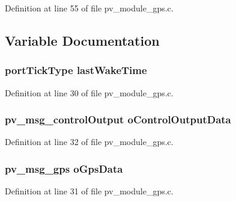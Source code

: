 Definition at line 55 of file pv\+\_\+module\+\_\+gps.\+c.



\subsection{Variable Documentation}
\subsubsection[{\texorpdfstring{last\+Wake\+Time}{lastWakeTime}}]{\setlength{\rightskip}{0pt plus 5cm}port\+Tick\+Type last\+Wake\+Time}\hypertarget{group__app__gps_gaa8db3871cb5f64abbd94ddd5a1db73a6}{}\label{group__app__gps_gaa8db3871cb5f64abbd94ddd5a1db73a6}


Definition at line 30 of file pv\+\_\+module\+\_\+gps.\+c.

\subsubsection[{\texorpdfstring{o\+Control\+Output\+Data}{oControlOutputData}}]{\setlength{\rightskip}{0pt plus 5cm}pv\+\_\+msg\+\_\+control\+Output o\+Control\+Output\+Data}\hypertarget{group__app__gps_ga0a14ca4568444d2d76c256fa91585cdf}{}\label{group__app__gps_ga0a14ca4568444d2d76c256fa91585cdf}


Definition at line 32 of file pv\+\_\+module\+\_\+gps.\+c.

\subsubsection[{\texorpdfstring{o\+Gps\+Data}{oGpsData}}]{\setlength{\rightskip}{0pt plus 5cm}pv\+\_\+msg\+\_\+gps o\+Gps\+Data}\hypertarget{group__app__gps_ga744821cc9c45de009ae70e6dc8d5e220}{}\label{group__app__gps_ga744821cc9c45de009ae70e6dc8d5e220}


Definition at line 31 of file pv\+\_\+module\+\_\+gps.\+c.

